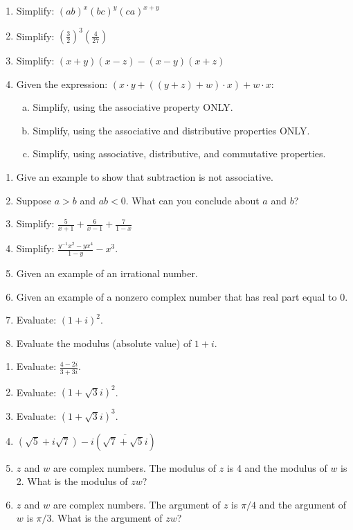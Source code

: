 
\begin{enumerate}[(1)]
\item
Simplify:
$ (ab)^x(bc)^y(ca)^{x+y}$
\item
Simplify:
$ \displaystyle{\left(\frac{3}{2}\right)^3 \left(\frac{4}{27}\right)} $
\item
Simplify:   $ \displaystyle{(x+y)(x-z) - (x-y)(x+z) }$
\item
Given the expression:  $(x \cdot y + ((y+z)+w) \cdot x) + w \cdot x$:
\begin{enumerate}[(a)]
\item
Simplify, using the associative property ONLY.
\item
Simplify, using the associative and distributive properties ONLY.
\item
Simplify, using associative, distributive, and commutative properties.
\end{enumerate}
\end{enumerate}

\begin{enumerate}[(1)]
\item
Give an example to show that subtraction is not associative.
\item
Suppose $a>b$ and $ab < 0$.  What can you conclude about $a$ and $b$?
\item
Simplify:   $\displaystyle{ \frac{5}{x+1} + \frac{6}{x-1} + \frac{7}{1-x}}$
\item
Simplify: $\displaystyle{\frac{y^{-1}x^2 - y x^4}{1-y} - x^3}$.
\item
Given an example of an irrational number.
\item
Given an example of a nonzero complex number that has real part equal to 0.
\item
Evaluate: $(1+i)^2$.
\item
Evaluate the modulus (absolute value) of $1+i$.
\end{enumerate}

\begin{enumerate}[(1)]
\item
Evaluate:  $\displaystyle{\frac{4 - 2i}{3 + 3i}}$.
\item
Evaluate:  $(1 + \sqrt{3}i)^2$.
\item
Evaluate:  $(1 + \sqrt{3}i)^3$.
\item
$( \sqrt{5} + i \sqrt{7}) - i (\overline{\sqrt{7} + \sqrt{5}i})$
\item
$z$ and $w$ are complex numbers. The modulus of $z$ is 4 and the modulus of $w$ is 2. What is the modulus of $zw$?
\item
$z$ and $w$ are complex numbers. The argument of $z$ is $\pi/4$ and the argument of $w$ is $\pi/3$. What is the argument of $zw$?
\end{enumerate}

